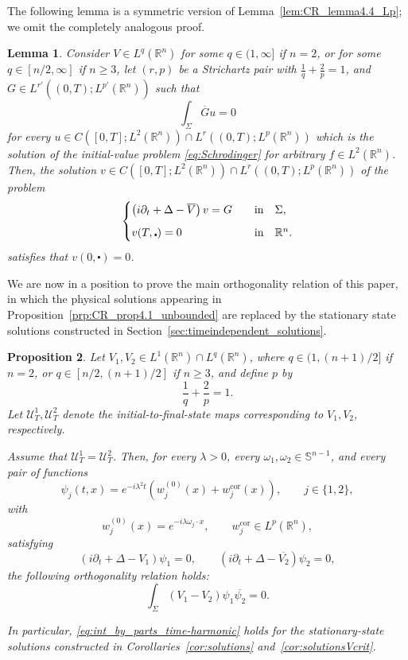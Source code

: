 \documentclass[11pt,a4paper]{amsart}
\newtheorem{proposition}{Proposition}[section]
\newtheorem{lemma}[proposition]{Lemma}
\theoremstyle{remark}
\theoremstyle{definition}
\newcommand{\R}{\mathbb{R}}
\newcommand{\Sph}{\mathbb{S}}
\def\ovl{\overline}
\def\cd{\centerdot}
\def\d{\partial}
\begin{document}
The following lemma is a symmetric version of Lemma~\ref{lem:CR_lemma4.4_Lp}; we omit the completely analogous proof.

\begin{lemma}\label{lem:CR_lemma4.4_Lp_symmetric}\sl Consider $V\in  L^q(\R^n)$ for some $q\in(1,\infty]$ if $n=2$, or for some $q\in[n/2,\infty]$ if $n\geq 3$, let $(r, p)$ be a Strichartz pair with $\frac{1}{q}+\frac{2}{p}=1$, and $G\in L^{r'}((0,T); L^{p'}(\R^n))$ such that 
\[
\int_\Sigma \ovl{G} u = 0
\]
for every $u \in C([0, T]; L^2(\R^n)) \cap L^r((0, T); L^p(\R^n)) $ which is the solution of the initial-value problem \eqref{eq:Schrodinger} for arbitrary $f\in L^2(\R^n)$. Then, the solution $v \in C([0, T]; L^2(\R^n)) \cap L^r((0, T); L^p(\R^n))$ of the problem 
\[
\begin{cases}
\left(i\d_t + \Delta - \ovl{V}\right) v = G \quad &\textrm{in}\quad \Sigma, 
\vspace{.6em}\\
v(T, \cd) = 0  \quad &\textrm{in}\quad \R^n.
\end{cases} 
\]
satisfies that $v(0, \cd)=0$.
\end{lemma}

We are now in a position to prove the main orthogonality relation of this paper, in which the physical solutions appearing in Proposition~\ref{prp:CR_prop4.1_unbounded} are replaced by the stationary state solutions constructed in Section~\ref{sec:timeindependent_solutions}.

\begin{proposition}\label{pr:int_by_parts_time-harmonic_solutions}\sl Let $V_1,V_2\in L^1(\R^n)\cap L^q(\R^n)$, where $q\in(1,(n+1)/2]$ if $n=2$, or $q\in[n/2,(n+1)/2]$ if $n\geq 3$, and define $p$ by 
\[
  \frac{1}{q}+\frac{2}{p}=1.
\]
Let $\mathcal U_T^1,\mathcal U_T^2$ denote the initial-to-final-state maps corresponding to $V_1,V_2$, respectively.

Assume that $\mathcal U_T^1=\mathcal U_T^2$. Then, for every $\lambda>0$, every $\omega_1,\omega_2\in\Sph^{n-1}$, and every pair of functions
\[
\psi_j(t,x)=e^{-i\lambda^2 t}\left(w_j^{(0)}(x)+w_j^{\mathrm{cor}}(x)\right),
\qquad j\in\{1,2\},
\]
with
\[
w_j^{(0)}(x)=e^{-i\lambda\omega_j\cdot x},  \qquad w_j^{\mathrm{cor}}\in L^p(\R^n),
\]
satisfying
\[
\left(i\partial_t+\Delta-V_1\right)\psi_1=0, \qquad \left(i\partial_t+\Delta-\overline{V_2}\right)\psi_2=0,
\]
the following orthogonality relation holds:
\begin{equation}\label{eq:int_by_parts_time-harmonic} \int_\Sigma (V_1-V_2) \psi_1 \overline{\psi_2}=0.
\end{equation}

In particular, \eqref{eq:int_by_parts_time-harmonic} holds for the stationary-state solutions constructed in Corollaries~\ref{cor:solutions} and~\ref{cor:solutionsVcrit}.
\end{proposition}
\end{document}
